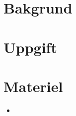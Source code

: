 \documentclass[12pt,a4paper]{article}
\begin{document}
\title{}
\author{}
\date{2015-03-20}%
\maketitle

\section*{Bakgrund} 

\section*{Uppgift}



\section*{Materiel}


\begin{itemize}
\item 
\end{itemize}

\end{document}

